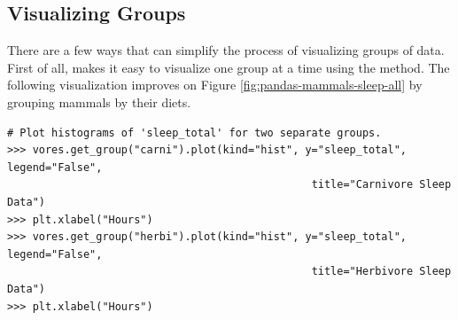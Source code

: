 \subsection*{Visualizing Groups} %

There are a few ways that  can simplify the process of visualizing groups of data.
First of all,  makes it easy to visualize one group at a time using the  method.
The following visualization improves on Figure \ref{fig:pandas-mammals-sleep-all} by grouping mammals by their diets.

\begin{lstlisting}
# Plot histograms of 'sleep_total' for two separate groups.
>>> vores.get_group("carni").plot(kind="hist", y="sleep_total", legend="False",
                                                title="Carnivore Sleep Data")
>>> plt.xlabel("Hours")
>>> vores.get_group("herbi").plot(kind="hist", y="sleep_total", legend="False",
                                                title="Herbivore Sleep Data")
>>> plt.xlabel("Hours")
\end{lstlisting}

